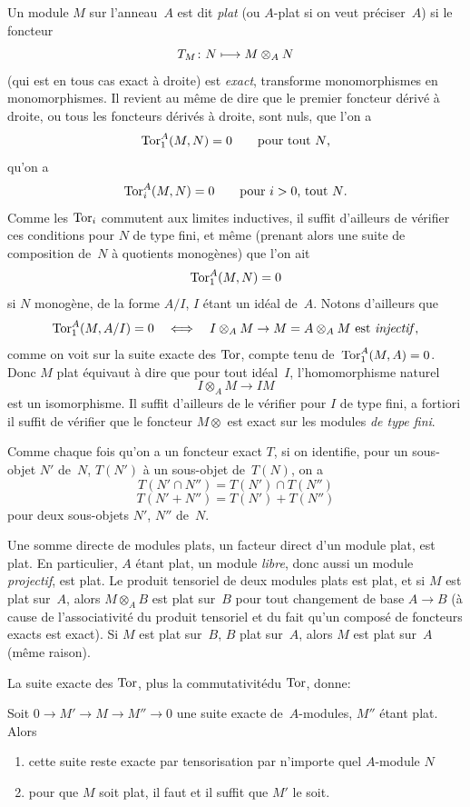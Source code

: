 Un module $M$ sur l'anneau~$A$ est dit \emph{plat}
(ou $A$-plat si on veut pr\'eciser~$A$)
si le foncteur
$$
T_M \colon N \mto M \otimes_{A}N
$$
(qui est en tous cas exact \`a droite) est
\emph{exact},
\ie transforme monomorphismes en monomorphismes. Il revient au
m\^eme de dire que le premier foncteur d\'eriv\'e \`a droite,
ou tous les foncteurs d\'eriv\'es \`a droite, sont nuls,
\ie que l'on a\enlargethispage{.5cm}
$$
\operatorname{Tor}^{A}_{1}(M,N)=0 \qquad \text{pour tout $N$,}
$$
\resp qu'on a
$$
\operatorname{Tor}^{A}_{i}(M,N)=0 \qquad \text{pour $i>0$, tout $N$.}
$$
Comme les $\operatorname{Tor}_{i}$ commutent aux limites inductives, il suffit
d'ailleurs de v\'erifier ces conditions pour $N$ de type fini, et
m\^eme (prenant alors une suite de composition de~$N$ \`a quotients
monog\`enes) que l'on ait
$$
\operatorname{Tor}^{A}_{1}(M,N)=0
$$
si $N$ monog\`ene, \ie de la forme $A/I$, $I$ \'etant un
id\'eal de~$A$. Notons d'ailleurs que
$$
\operatorname{Tor}^{A}_{1}(M,A/I)=0 \quad\Longleftrightarrow\quad I\otimes_{A}M \rightarrow
M=A\otimes_{A}M\text{ est \emph{injectif}},
$$
comme on voit sur la suite exacte des $\operatorname{Tor}$,
compte tenu de~$\operatorname{Tor}^{A}_{1}(M,A)=0$. Donc $M$ plat \'equivaut \`a
dire que pour tout id\'eal~$I$, l'homomorphisme naturel
$$
I\otimes_{A}M \to IM
$$
est un isomorphisme. Il suffit d'ailleurs de le v\'erifier pour $I$
de type fini, a fortiori il suffit de v\'erifier que le foncteur
$M\otimes$ est exact sur les modules \emph{de type fini}.

Comme chaque fois qu'on a un foncteur exact $T$, si on identifie, pour
un sous-objet $N'$ de~$N$, $T(N')$ \`a un sous-objet de~$T(N)$, on a
$$
T(N' \cap N'')=T(N') \cap T(N'')
$$
$$
T(N' + N'')=T(N') + T(N'')
$$
pour deux sous-objets $N'$, $N''$ de~$N$.

Une somme directe de modules plats, un facteur direct d'un module
plat, est plat. En particulier, $A$ \'etant plat, un module
\emph{libre}, donc aussi un module \emph{projectif}, est plat. Le
produit tensoriel de deux modules plats est plat, et si $M$ est plat
sur~$A$, alors $M\otimes_{A}B$ est plat sur~$B$ pour tout changement
de base
$A \to B$
(\`a cause de l'associativit\'e du produit tensoriel et du fait
qu'un compos\'e de foncteurs
exacts est exact). Si $M$ est plat sur~$B$, $B$ plat sur~$A$, alors
$M$ est plat sur~$A$ (m\^eme raison).

La suite exacte des $\operatorname{Tor}$, plus la \og commutativit\'e\fg du $\operatorname{Tor}$,
donne:

\begin{proposition}
\label{IV.1.1}
Soit $0 \to M' \to M \to M'' \to 0$ une suite exacte de~$A$-modules,
$M''$ \'etant plat. Alors
\begin{enumerate}
\item[(i)] cette suite reste exacte par tensorisation par n'importe
quel $A$-module $N$
\item[(ii)] pour que $M$ soit plat, il faut et il suffit que $M'$ le
soit.
\end{enumerate}
\end{proposition}

